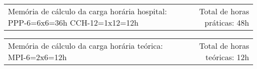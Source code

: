 {\fontsize{10pt}{12pt}\selectfont
\noindent
\begin{tabularx}{\linewidth}{@{}X r@{}}
Memória de cálculo da carga horária hospital:
PPP-6=6x6=36h
CCH-12=1x12=12h&
Total de horas práticas: 48h\\
\end{tabularx}
\noindent
\begin{tabularx}{\linewidth}{@{}X r@{}}
Memória de cálculo da carga horária teórica: 
MPI-6=2x6=12h &
Total de horas teóricas: 12h
\end{tabularx}
}